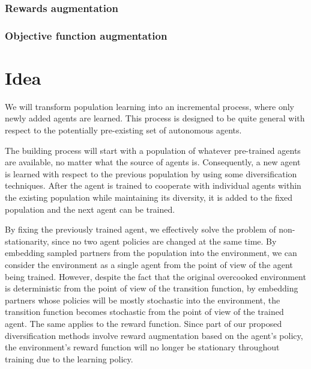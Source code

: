 \subsubsection{Rewards augmentation}
\subsubsection{Objective function augmentation}




\section{Idea}


We will transform population learning into an incremental process, where only newly added agents are learned.
This process is designed to be quite general with respect to the potentially pre-existing set of autonomous agents.

The building process will start with a population of whatever pre-trained agents are available, no matter what the source of agents is.
Consequently, a new agent is learned with respect to the previous population by using some diversification techniques.
After the agent is trained to cooperate with individual agents within the existing population while maintaining its diversity, it is added to the fixed population and the next agent can be trained.

By fixing the previously trained agent, we effectively solve the problem of non-stationarity, since no two agent policies are changed at the same time.
By embedding sampled partners from the population into the environment, we can consider the environment as a single agent from the point of view of the agent being trained.
However, despite the fact that the original overcooked environment is deterministic from the point of view of the transition function, by embedding partners whose policies will be mostly stochastic into the environment, the transition function becomes stochastic from the point of view of the trained agent.
The same applies to the reward function.
Since part of our proposed diversification methods involve reward augmentation based on the agent's policy, the environment's reward function will no longer be stationary throughout training due to the learning policy.


